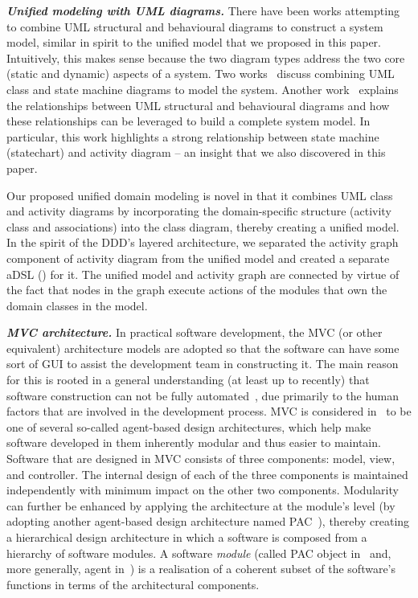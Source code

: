 \textbf{\textit{Unified modeling with UML diagrams.}}
There have been works attempting to combine UML structural and behavioural diagrams to construct a system model, similar in spirit to the unified model that we proposed in this paper. Intuitively, this makes sense because the two diagram types address the two core (static and dynamic) aspects of a system. Two works~\cite{kohler_integrating_2000, niaz_object-oriented_2005} discuss combining UML class and state machine diagrams to model the system. Another work~\cite{selonen_transformations_2003} explains the relationships between UML structural and behavioural diagrams and how these relationships can be leveraged to build a complete system model. In particular, this work highlights a strong relationship between state machine (\aka statechart) and activity diagram -- an insight that we also discovered in this paper. 

Our proposed unified domain modeling is novel in that it combines UML class and activity diagrams by incorporating the domain-specific structure (activity class and associations) into the class diagram, thereby creating a unified model. In the spirit of the DDD's layered architecture, we separated the activity graph component of activity diagram from the unified model and created a separate aDSL (\agl) for it. The unified model and activity graph are connected by virtue of the fact that nodes in the graph execute actions of the modules that own the domain classes in the model.

\textbf{\textit{MVC architecture.}}
In practical software development, the MVC (or other equivalent) architecture models are adopted so that the software can have some sort of GUI to assist the development team in constructing it. The main reason for this is rooted in a general understanding (at least up to recently) that software construction can not be fully automated~\cite{fuggetta_software_2014}, due primarily to the human factors that are involved in the development process. 
%
MVC is considered in~\cite{calvary_single-user_1997} to be one of several so-called agent-based design architectures, which help make software developed in them inherently modular and thus easier to maintain. 
Software that are designed in MVC consists of three components: model, view, and controller.
The internal design of each of the three components is maintained independently with minimum impact on the other two components. Modularity can further be enhanced by applying the architecture at the module's level (\eg by adopting another agent-based design architecture named PAC~\cite{coutaz_pac:_1987}), thereby creating a hierarchical design architecture in which a software is composed from a hierarchy of software modules. A software \textit{module} (called PAC object in~\cite{coutaz_pac:_1987} and, more generally, agent in~\cite{calvary_single-user_1997}) is a realisation of a coherent subset of the software's functions in terms of the architectural components.

